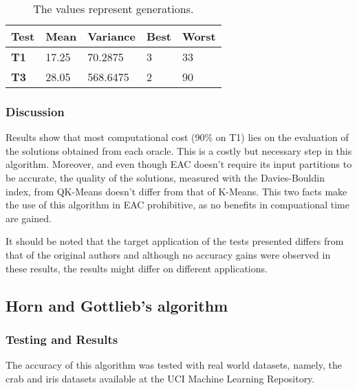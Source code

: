 
\begin{table}[h]
\caption{The values represent generations.}
\begin{tabular}{|l|l|l|l|l|}
\hline
\textbf{Test} & \textbf{Mean} & \textbf{Variance} & \textbf{Best} & \textbf{Worst} \\ \hline
\textbf{T1}   & 17.25         & 70.2875           & 3             & 33             \\ \hline
\textbf{T3}   & 28.05         & 568.6475          & 2             & 90             \\ \hline
\end{tabular}
\label{tab:db_index_t1_t3}
\end{table}

\subsubsection{Discussion}

Results show that most computational cost (90\% on T1) lies on the evaluation of the solutions obtained from each oracle. This is a costly but necessary step in this algorithm. Moreover, and even though EAC doesn't require its input partitions to be accurate, the quality of the solutions, measured with the Davies-Bouldin index, from QK-Means doesn't differ from that of K-Means. This two facts make the use of this algorithm in EAC prohibitive, as no benefits in compuational time are gained.

It should be noted that the target application of the tests presented differs from that of the original authors and although no accuracy gains were observed in these results, the results might differ on different applications.

\subsection{Horn and Gottlieb's algorithm}


\subsubsection{Testing and Results}




The accuracy of this algorithm was tested with real world datasets, namely, the crab and iris datasets available at the UCI Machine Learning Repository.

